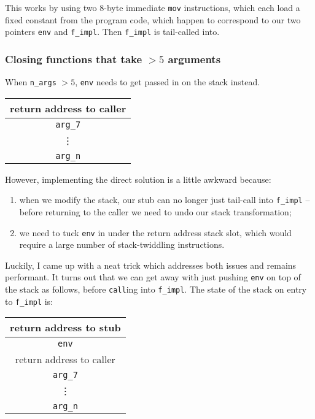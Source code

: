 \documentclass[12pt,a4paper,twoside,openright]{report}
\begin{document}
This works by using two 8-byte immediate \lstinline!mov! instructions, which
each load a fixed constant from the program code, which happen to correspond to
our two pointers \lstinline!env! and \lstinline!f_impl!.
Then \lstinline!f_impl! is tail-called into.

\subsubsection{Closing functions that take $> 5$ arguments}

When \lstinline!n_args! $> 5$, \lstinline!env! needs to get passed in on the
stack instead.

\begin{tabular}{c}
  return address to caller
  \\ \hline\hline
  \lstinline!arg_7!
  \\ \hline
  \vdots
  \\ \hline
  \lstinline!arg_n!
\end{tabular}

However, implementing the direct solution is a little awkward because:
\begin{enumerate}
  \item when we modify the stack, our stub can no longer just tail-call
    into \lstinline!f_impl! -- before returning to the caller we need to undo
    our stack transformation;
  \item we need to tuck \lstinline!env! in under the return address
    stack slot, which would require a large number of stack-twiddling
    instructions.
\end{enumerate}

Luckily, I came up with a neat trick which addresses both issues and remains
performant. It turns out that we can get away with just pushing \lstinline!env!
on top of the stack as follows, before \lstinline!call!ing into
\lstinline!f_impl!. The state of the stack on entry to \lstinline!f_impl! is:

\begin{tabular}{c}
  return address to stub
  \\ \hline\hline
  \lstinline!env!
  \\ \hline
  return address to caller
  \\ \hline
  \lstinline!arg_7!
  \\ \hline
  \vdots
  \\ \hline
  \lstinline!arg_n!
\end{tabular}
\end{document}
